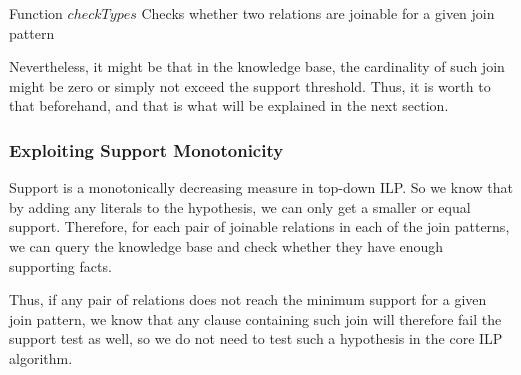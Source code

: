 \begin{algorithm}[h!]
  \caption{Function $checkTypes$ \newline Checks whether two relations are joinable for a given join pattern}
   {
  }
   {
  }
 \label{alg1}
\end{algorithm}

Nevertheless, it might be that in the knowledge base, the cardinality of such join might be zero or simply not exceed
the support threshold. Thus, it is worth to that beforehand, and that is what will be explained in the next section.

\subsubsection{Exploiting Support Monotonicity}

Support is a monotonically decreasing measure in top-down ILP. So we know that by adding any
literals to the hypothesis, we can only get a smaller or equal support. Therefore, for each pair of joinable relations
in each of the join patterns, we can query the knowledge base and check whether they have enough supporting facts.

Thus, if any pair of relations does not reach the minimum support for a given join pattern, we know that any clause
containing such join will therefore fail the support test as well, so we do not need to test such a hypothesis in the
core ILP algorithm.

